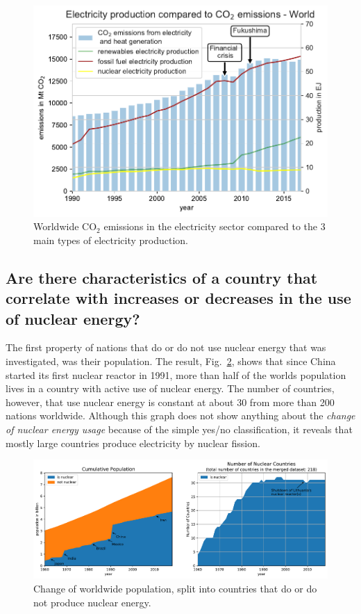 \documentclass[a4paper,10pt,twocolumn]{scrartcl}
\begin{document}
\begin{figure}[h]
	\centering
 	\includegraphics[width=\columnwidth]{../figures/q2/q2_plot_world_abs.pdf}
 	\caption{Worldwide CO$_2$ emissions in the electricity sector compared to the 3 main types of electricity production.}
 	\label{fig:q2_plot1}
\end{figure}


\subsection{Are there characteristics of a country that correlate with increases or decreases in the use of nuclear energy?}

The first property of nations that do or do not use nuclear energy that was investigated, was their population. The result, Fig.~\ref{fig:q3_population}, shows that since China started its first nuclear reactor in 1991, more than half of the worlds population lives in a country with active use of nuclear energy. The number of countries, however, that use nuclear energy is constant at about 30 from more than 200 nations worldwide. Although this graph does not show anything about the \emph{change of nuclear energy usage} because of the simple yes/no classification, it reveals that mostly large countries produce electricity by nuclear fission.

\begin{figure}[hbt]
	\centering
	\includegraphics[width=\columnwidth, trim=0 0 160mm 0, clip]{../figures/q3_population.pdf}
	\caption{Change of worldwide population, split into countries that do or do not produce nuclear energy.}
	\label{fig:q3_population}
\end{figure}
\end{document}
